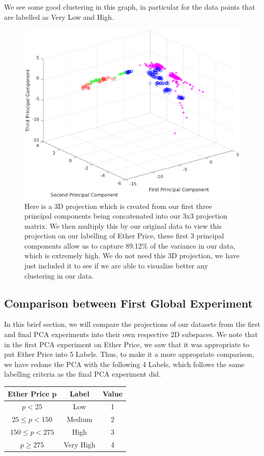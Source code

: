 \documentclass{article}
\begin{document}
We see some good clustering in this graph, in particular for the data points that are labelled as Very Low and High. 


\begin{figure}[H]
\centering
\caption{Here is a 3D projection which is created from our first three principal components being concatenated into our 3x3 projection matrix. We then multiply this by our original data to view this projection on our labelling of Ether Price, these first 3 principal components allow us to capture 89.12\% of the variance in our data, which is extremely high. We do not need this 3D projection, we have just included it to see if we are able to visualize better any clustering in our data.}
\includegraphics{final/btc_3d_projection.eps}
\end{figure}
 

\subsection{Comparison between First Global Experiment}
In this brief section, we will compare the projections of our datasets from the first and final PCA experiments into their own respective 2D subspaces. We note that in the first PCA experiment on Ether Price, we saw that it was appropriate to put Ether Price into 5 Labels. Thus, to make it a more appropriate comparison, we have redone the PCA with the following 4 Labels, which follows the same labelling criteria as the final PCA experiment did.

\begin{center}
\begin{tabular}{ |c|c|c| } 
\hline
Ether Price p & Label & Value\\
\hline
$p < 25$ & Low & 1\\ 
$25 \leq p < 150$ & Medium & 2\\ 
$150 \leq p < 275$ & High & 3\\ 
$ p \geq 275$ & Very High & 4\\ 
\hline
\end{tabular}
\end{center}
\end{document}
